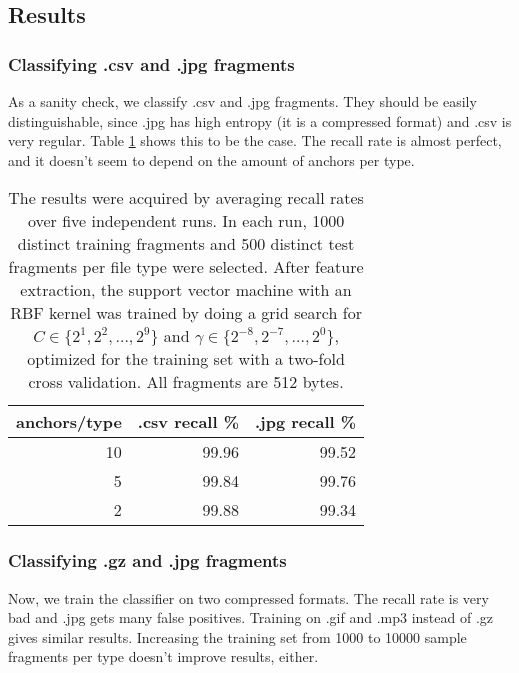 \subsection{Results}

\subsubsection{Classifying .csv and .jpg fragments}

As a sanity check, we classify .csv and .jpg fragments. They should be
easily distinguishable, since .jpg has high entropy (it is a compressed
format) and .csv is very regular. Table \ref{table:csv_jpg_recall} shows
this to be the case. The recall rate is almost perfect, and it doesn't
seem to depend on the amount of anchors per type.

\begin{table}[h]
\begin{tabular}{rrr}
\hline
   anchors/type &   .csv recall \% &   .jpg recall \% \\
\hline
             10 &           99.96 &           99.52 \\
              5 &           99.84 &           99.76 \\
              2 &           99.88 &           99.34 \\
\hline
\end{tabular}
\caption{
The results were acquired by averaging recall rates over five
independent runs. In each run, 1000 distinct training fragments and 500
distinct test fragments per file type were selected. After feature
extraction, the support vector machine with an RBF kernel was trained by doing a grid search
for $C \in \{ 2^{1}, 2^{2}, \dots, 2^{9} \}$ and $\gamma \in \{2^{-8},
2^{-7}, \dots, 2^{0} \}$, optimized for the training set with a two-fold
cross validation. All fragments are 512 bytes.}
\label{table:csv_jpg_recall}
\end{table}

\subsubsection{Classifying .gz and .jpg fragments}

Now, we train the classifier on two compressed formats. The recall rate is
very bad and .jpg gets many false positives. Training on .gif and .mp3
instead of .gz gives similar results. Increasing the training set from 1000 to 10000 sample fragments per type doesn't improve results, either.

